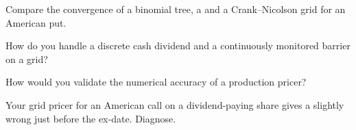 \begin{interviewq}\label{iq:dv:trees-and-finite-difference-pricers-in-practice:3}
Compare the convergence of a binomial tree, a  and a Crank--Nicolson grid for an American put.
\end{interviewq}

\begin{interviewq}\label{iq:dv:trees-and-finite-difference-pricers-in-practice:4}
How do you handle a discrete cash dividend and a continuously monitored barrier on a grid?
\end{interviewq}

\begin{interviewq}\label{iq:dv:trees-and-finite-difference-pricers-in-practice:5}
How would you validate the numerical accuracy of a production pricer?
\end{interviewq}

\begin{interviewq}\label{iq:dv:trees-and-finite-difference-pricers-in-practice:6}
Your grid pricer for an American call on a dividend-paying share gives a slightly wrong  just before the ex-date. Diagnose.
\end{interviewq}
